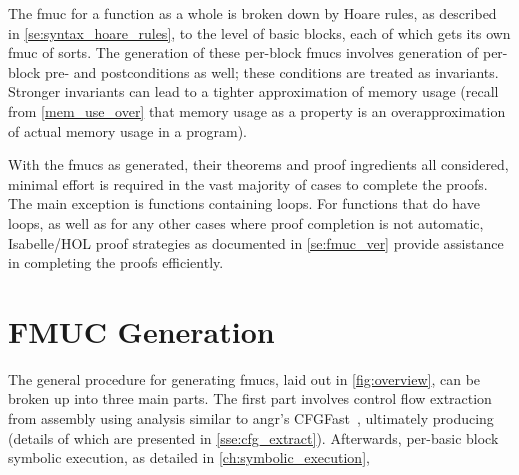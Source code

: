 The \ac{fmuc} for a function as a whole is broken down by Hoare rules,
as described in \cref{se:syntax_hoare_rules},
to the level of basic blocks, each of which gets its own \ac{fmuc} of sorts.
The generation of these per-block \acp{fmuc} involves generation of per-block
pre- and postconditions as well; these conditions are treated as invariants.
Stronger invariants can lead to a tighter approximation of memory usage%
(recall from \cref{mem_use_over} that memory usage as a property
is an overapproximation of actual memory usage in a program).

With the \acp{fmuc} as generated, their theorems and proof ingredients all considered,
minimal effort is required in the vast majority of cases to complete the proofs.
The main exception is functions containing loops.
For functions that do have loops,
as well as for any other cases where proof completion is not automatic,
Isabelle/HOL proof strategies as documented in \cref{se:fmuc_ver}
provide assistance in completing the proofs efficiently.

\section{FMUC Generation}\label{se:fmuc_gen}
\begin{figure*}
  \centering
  \caption{\acs*{fmuc} overview}\label{fig:overview}
\end{figure*}

The general procedure for generating \acp{fmuc}, laid out in \cref{fig:overview},
can be broken up into three main parts.
The first part involves control flow extraction from assembly using  analysis
similar to angr's CFGFast~\citep{shoshitaishvili2016state},%
ultimately producing  (details of which are presented
in \cref{sse:cfg_extract}).
Afterwards, per-basic block symbolic execution,
as detailed in \cref{ch:symbolic_execution},

